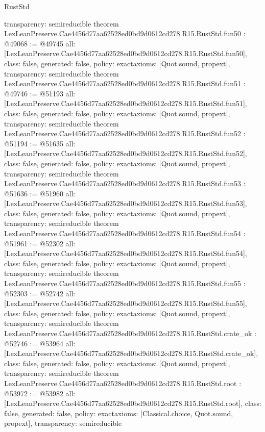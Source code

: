 \begin{lexlean}{RustStd}
\begin{coremodule}
{  transparency: semireducible
}
theorem LexLeanPreserve.Cae4456d77aa62528ed0bd9d0612cd278.R15.RustStd.fun50 : @49068 := @49745 {
  all: [LexLeanPreserve.Cae4456d77aa62528ed0bd9d0612cd278.R15.RustStd.fun50],
  class: false,
  generated: false,
  policy: exact{axioms: [Quot.sound, propext]},
  transparency: semireducible
}
theorem LexLeanPreserve.Cae4456d77aa62528ed0bd9d0612cd278.R15.RustStd.fun51 : @49746 := @51193 {
  all: [LexLeanPreserve.Cae4456d77aa62528ed0bd9d0612cd278.R15.RustStd.fun51],
  class: false,
  generated: false,
  policy: exact{axioms: [Quot.sound, propext]},
  transparency: semireducible
}
theorem LexLeanPreserve.Cae4456d77aa62528ed0bd9d0612cd278.R15.RustStd.fun52 : @51194 := @51635 {
  all: [LexLeanPreserve.Cae4456d77aa62528ed0bd9d0612cd278.R15.RustStd.fun52],
  class: false,
  generated: false,
  policy: exact{axioms: [Quot.sound, propext]},
  transparency: semireducible
}
theorem LexLeanPreserve.Cae4456d77aa62528ed0bd9d0612cd278.R15.RustStd.fun53 : @51636 := @51960 {
  all: [LexLeanPreserve.Cae4456d77aa62528ed0bd9d0612cd278.R15.RustStd.fun53],
  class: false,
  generated: false,
  policy: exact{axioms: [Quot.sound, propext]},
  transparency: semireducible
}
theorem LexLeanPreserve.Cae4456d77aa62528ed0bd9d0612cd278.R15.RustStd.fun54 : @51961 := @52302 {
  all: [LexLeanPreserve.Cae4456d77aa62528ed0bd9d0612cd278.R15.RustStd.fun54],
  class: false,
  generated: false,
  policy: exact{axioms: [Quot.sound, propext]},
  transparency: semireducible
}
theorem LexLeanPreserve.Cae4456d77aa62528ed0bd9d0612cd278.R15.RustStd.fun55 : @52303 := @52742 {
  all: [LexLeanPreserve.Cae4456d77aa62528ed0bd9d0612cd278.R15.RustStd.fun55],
  class: false,
  generated: false,
  policy: exact{axioms: [Quot.sound, propext]},
  transparency: semireducible
}
theorem LexLeanPreserve.Cae4456d77aa62528ed0bd9d0612cd278.R15.RustStd.crate_ok : @52746 := @53964 {
  all: [LexLeanPreserve.Cae4456d77aa62528ed0bd9d0612cd278.R15.RustStd.crate_ok],
  class: false,
  generated: false,
  policy: exact{axioms: [Quot.sound, propext]},
  transparency: semireducible
}
theorem LexLeanPreserve.Cae4456d77aa62528ed0bd9d0612cd278.R15.RustStd.root : @53972 := @53982 {
  all: [LexLeanPreserve.Cae4456d77aa62528ed0bd9d0612cd278.R15.RustStd.root],
  class: false,
  generated: false,
  policy: exact{axioms: [Classical.choice, Quot.sound, propext]},
  transparency: semireducible
}


\end{coremodule}
\end{lexlean}

